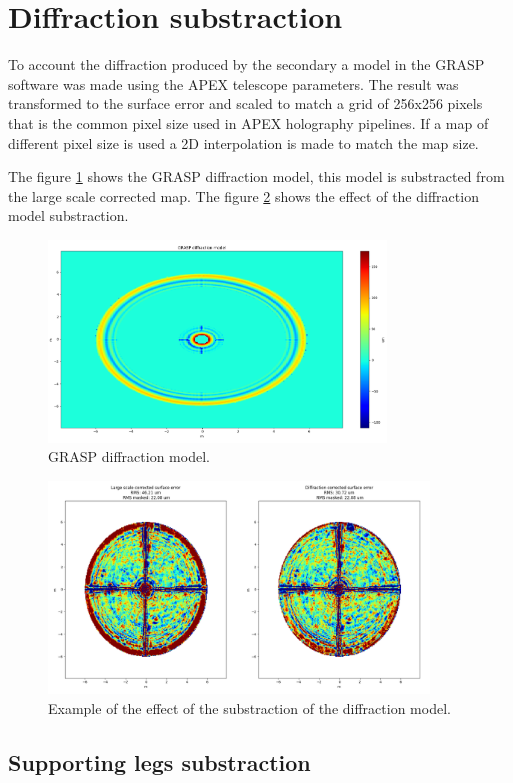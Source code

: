 \newpage
\section{Diffraction substraction}

To account the diffraction produced by the secondary a model in the GRASP software was made using the APEX telescope parameters.
The result was transformed to the surface error and scaled to match a grid of 256x256 pixels that is the common pixel size used in APEX holography pipelines. If a map of different pixel size is used a 2D interpolation is made to match the map size.

The figure \ref{fig:grasp_diffraction} shows the GRASP diffraction model, this model is substracted from the large scale corrected map. The figure \ref{fig:diffraction_corrected} shows the effect of the diffraction model substraction.


\begin{figure}
    \centering
    \includegraphics[width=0.8\textwidth]{images/grasp_diffraction_model.png}
    \caption{GRASP diffraction model.}
    \label{fig:grasp_diffraction}
\end{figure}


\begin{figure}
    \centering
    \includegraphics[width=0.9\textwidth]{images/diffraction_correction.png}
    \caption{Example of the effect of the substraction of the diffraction model.}
    \label{fig:diffraction_corrected}
\end{figure}



\subsection{Supporting legs substraction}

